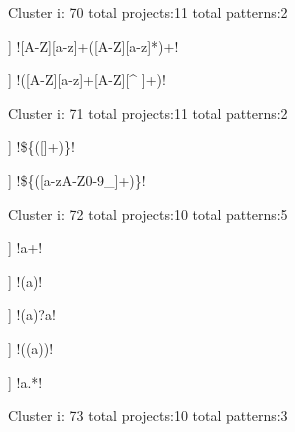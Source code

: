 Cluster i: 70
total projects:11
total patterns:2
\begin{multicols}{1}
\begin{description}[noitemsep,topsep=0pt]
\item [[8] ] \cverb![A-Z][a-z]+([A-Z][a-z]*)+!
\item [[3] ] \cverb!([A-Z][a-z]+[A-Z][^ ]+)!
\end{description}
\end{multicols}







Cluster i: 71
total projects:11
total patterns:2
\begin{multicols}{1}
\begin{description}[noitemsep,topsep=0pt]
\item [[6] ] \cverb!\$\{([\w\-]+)\}!
\item [[5] ] \cverb!\$\{([a-zA-Z0-9\-_]+)\}!
\end{description}
\end{multicols}







Cluster i: 72
total projects:10
total patterns:5
\begin{multicols}{1}
\begin{description}[noitemsep,topsep=0pt]
\item [[8] ] \cverb!a+!
\item [[8] ] \cverb!(a)!
\item [[7] ] \cverb!(a)?a!
\item [[6] ] \cverb!((a))!
\item [[2] ] \cverb!a.*!
\end{description}
\end{multicols}







Cluster i: 73
total projects:10
total patterns:3
\begin{multicols}{1}
\end{multicols}







